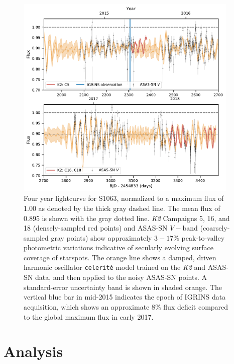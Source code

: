 \documentclass[trackchanges]{aastex631}
\begin{document}
\begin{figure}[ht]
  \centering
  \includegraphics[width=0.95\textwidth]{figures/2020_K2_ASASSN_lcurve_2panel.pdf}
\caption{Four year lightcurve for S1063, normalized to a maximum flux of 1.00 as denoted by the thick gray dashed line. The mean flux of 0.895 is shown with the gray dotted line.  \emph{K2} Campaigns 5, 16, and 18 (densely-sampled red points) and ASAS-SN $V-$band (coarsely-sampled gray points) show approximately $3-17\%$ peak-to-valley photometric variations indicative of secularly evolving surface coverage of starspots.  The orange line shows a damped, driven harmonic oscillator \texttt{celerit\`e} model \citep{2017AJ....154..220F} trained on the \emph{K2} and ASAS-SN data, and then applied to the noisy ASAS-SN points. A standard-error uncertainty band is shown in shaded orange. The vertical blue bar in mid-2015 indicates the epoch of IGRINS data acquisition, which shows an approximate $8\%$ flux deficit compared to the global maximum flux in early 2017.}
\label{fig:lightcurve}
\end{figure}


\section{Analysis}
\label{sec:analysis}
\end{document}
